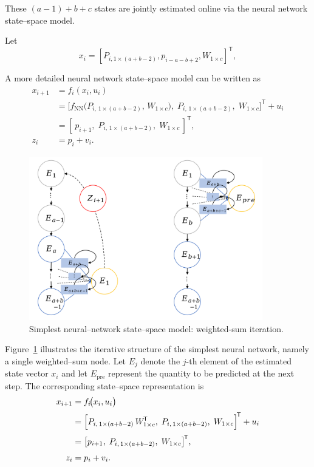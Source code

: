 \documentclass[sn-nature]{sn-jnl}%
\theoremstyle{thmstyleone}%
\theoremstyle{thmstyletwo}%
\theoremstyle{thmstylethree}%
\begin{document}
These \((a-1)+b+c\) states are jointly estimated online via the neural network state–space model.

Let
\noindent
\begin{equation}
{x_i} = {[P_{i,1 \times (a+b-2)},{p_{i-a-b+2}},{W_{1 \times c}}]^{\!\mathsf T}},
\label{3_3}
\end{equation}

A more detailed neural network state–space model can be written as
\noindent
\begin{equation}
\begin{aligned}
x_{i+1} &= f_i(x_i,u_i) \\ 
        &= \bigl[f_{\mathrm{NN}}\bigl(P_{i,\,1\times(a+b-2)},\,W_{1\times c}\bigr),\;P_{i,\,1\times(a+b-2)},\;W_{1\times c}\bigr]^{\!\mathsf T}
           + u_i \\ 
        &= [\,p_{i+1},\;P_{i,\,1\times(a+b-2)},\;W_{1\times c}\,]^{\!\mathsf T},\\
z_i     &= p_i + v_i.
\end{aligned}
\label{eq:NNSSM_detailed}
\end{equation}


\begin{figure}[!t]
  \centering
  \includegraphics[width=4in]{fig/fig3_2.png}
  \caption{Simplest neural–network state–space model: weighted-sum iteration.}
  \label{fig:SNNSSM}
\end{figure}

Figure~\ref{fig:SNNSSM} illustrates the iterative structure of the simplest neural network, namely a single weighted–sum node.  Let \(E_j\) denote the \(j\)-th element of the estimated state vector \(x_i\) and let \(E_{\mathrm{pre}}\) represent the quantity to be predicted at the next step.  The corresponding state–space representation is
\begin{equation}
\label{eq:NNSSM_simple}
\begin{aligned}
x_{i+1} &= f_i\!\bigl(x_i,u_i\bigr) \\[2pt]
        &= \Bigl[P_{i,\,1\times(a+b-2)}\,W_{1\times c}^{\!\mathsf T},\;
                 P_{i,\,1\times(a+b-2)},\;
                 W_{1\times c}\Bigr]^{\!\mathsf T}
           + u_i \\[2pt]
        &= \bigl[p_{i+1},\;P_{i,\,1\times(a+b-2)},\;W_{1\times c}\bigr]^{\!\mathsf T},\\[4pt]
z_i     &= p_i + v_i.
\end{aligned}
\end{equation}
\end{document}
